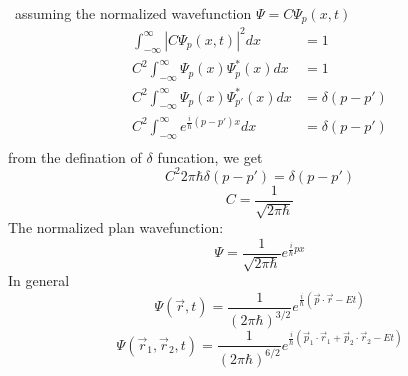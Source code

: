 \begin{frame}[allowframebreaks=]  
    \Solution  ~assuming the normalized wavefunction 
    $\Psi=C\Psi_p (x,t)$
    \begin{equation*}
        \begin{split}
            \int_{-\infty} ^\infty |C\Psi_p (x,t)|^2 dx &=1  \\
            C^2 \int_{-\infty} ^\infty \Psi_p (x) \Psi_{p} ^* (x) dx &=1  \\
            C^2 \int_{-\infty} ^\infty \Psi_p (x) \Psi_{p'} ^* (x) dx &=\delta (p-p')  \\
            C^2 \int_{-\infty} ^\infty e^{\frac{i}{\hbar}(p-p')x} dx &=\delta (p-p')\\
        \end{split} 
     \end{equation*}
     from the defination of $\delta$ funcation, we get
     \[C^2 2\pi \hbar \delta (p-p') =\delta(p-p') \]
     \[C= \dfrac{1}{\sqrt{2\pi \hbar}}\]
     The normalized plan wavefunction:
     \begin{equation*}
        \Psi=\frac{1}{\sqrt{2\pi \hbar}} e^{\frac{i}{\hbar}px}
    \end{equation*}  
    In general
    \[ \Psi(\vec r ,t)=\frac{1}{(2\pi \hbar)^{3/2}} e^{\frac{i}{\hbar}(\vec p\cdot \vec r -Et)} \]
    \[ \Psi(\vec r_1 ,\vec r_2, t)=\frac{1}{(2\pi \hbar)^{6/2}} e^{\frac{i}{\hbar}(\vec p_1 \cdot \vec r_1 +\vec p_2 \cdot \vec r_2 -Et)} \]
\end{frame}


